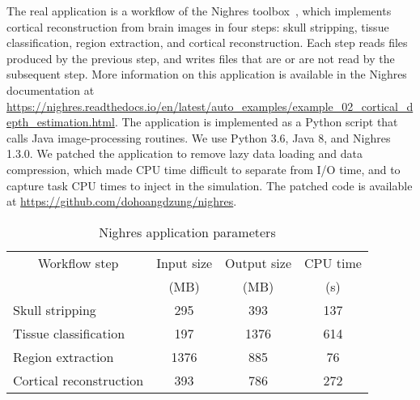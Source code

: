\documentclass[conference]{IEEEtran}
\begin{document}
        The real application is a workflow of the Nighres
        toolbox~\cite{huntenburg2018nighres}, which implements cortical
        reconstruction from brain images in four steps: skull stripping,
        tissue classification, region extraction, and cortical
        reconstruction. Each step reads files produced by the previous step,
        and writes files that are or are not read by the subsequent step.
        More information on this application is available in the Nighres
        documentation at
        \url{https://nighres.readthedocs.io/en/latest/auto_examples/example_02_cortical_depth_estimation.html}.
        The application is implemented as a Python script that calls Java
        image-processing routines. We use Python 3.6, Java 8, and Nighres
        1.3.0. We patched the application to remove lazy data loading and
        data compression, which made CPU time difficult to separate from
        I/O time, and to capture task CPU times to inject in the
        simulation. The patched code is available at
        \url{https://github.com/dohoangdzung/nighres}.
        \begin{table}[t]
            \centering
            \begin{tabular}{lccc}
            \toprule
                \multicolumn{1}{c}{Workflow step}& Input size       & Output size      & CPU time\\
                                       & (MB)             & (MB)             & (s)\\
            \midrule
               Skull stripping         &  295             & 393               & 137 \\
               Tissue classification   &  197              & 1376              & 614 \\
               Region extraction       &  1376             & 885              & 76 \\
               Cortical reconstruction &  393              & 786              & 272\\
            \bottomrule
            \end{tabular} 
            \caption{Nighres application parameters}
            \label{table:nighres_stats}
            \end{table}
\end{document}
